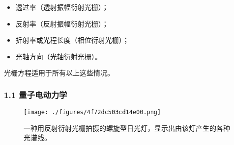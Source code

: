 \begin{itemize}
\item 透过率（透射振幅衍射光栅）；
\item 反射率（反射振幅衍射光栅）；
\item 折射率或光程长度（相位衍射光栅）；
\item 光轴方向（光轴衍射光栅）。
\end{itemize}

光栅方程适用于所有以上这些情况。

\subsubsection{1.1 量子电动力学}
\begin{figure}[ht]
\centering
\texttt{[image: ./figures/4f72dc503cd14e00.png]}
\caption{一种用反射衍射光栅拍摄的螺旋型日光灯，显示出由该灯产生的各种光谱线。} \label{fig_YSGS_4}
\end{figure}
